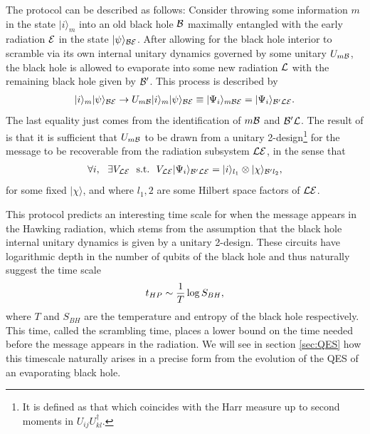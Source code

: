 \documentclass[12pt]{article}
\newcommand{\ran}{\rangle}
\begin{document}
The protocol can be described as follows: Consider throwing some information $m$ in the state $| i \ran_m$ into an old black hole ${\cal B}$ maximally entangled with the early radiation ${\cal E}$ in the state $| \psi \ran_{{\cal BE}}$. After allowing for the black hole interior to scramble via its own internal unitary dynamics governed by some unitary $U_{m \cal{B}}$, the black hole is allowed to evaporate into some new radiation $\cal{L}$ with the remaining black hole given by $\cal{B}'$. This process is described by
\begin{align}
|i \ran_{m} | \psi \ran_{{\cal BE}} \rightarrow U_{m \cal{B}} | i \ran_m | \psi \ran_{{\cal BE}}  \equiv | \Psi_i \ran_{m{\cal BE}} = | \Psi_i \ran_{{\cal B' L E}}.
\end{align}
The last equality just comes from the identification of $m\cal{B}$ and ${\cal{B' L}}$. The result of \cite{Hayden:2007cs} is that it is sufficient that $U_{m \cal{B}}$ to be drawn from a unitary 2-design\footnote{It is defined as that which coincides with the Harr measure up to second moments in $U_{ij} U_{kl}^\dagger$.} for the message to be recoverable from the radiation subsystem $\cal{L E}$, in the sense that
\begin{align}
\forall i, \ \ \exists V_{{\cal LE}} \ \ \mathrm{s.t.} \  \ V_{{\cal LE}} | \Psi_i \ran_{{\cal B' L E}} = | i \ran_{l_1} \otimes | \chi \ran_{{\cal B}'l_2} ,\label{HPcondition}
\end{align}
for some fixed $| \chi \ran$, and where $l_1,2$ are some Hilbert space factors of $\cal{L E}$.

This protocol predicts an interesting time scale for when the message appears in the Hawking radiation, which stems from the assumption that the black hole internal unitary dynamics is given by a unitary 2-design. These circuits have logarithmic depth in the number of qubits of the black hole and thus naturally suggest the time scale
\begin{align}
t_{HP} \sim {1 \over T} \log S_{BH},
\end{align}
where $T$ and $S_{BH}$ are the temperature and entropy of the black hole respectively. This time, called the scrambling time, places a lower bound on the time needed before the message appears in the radiation. We will see in section \ref{sec:QES} how this timescale naturally arises  in a precise form from the evolution of the QES of an evaporating black hole.
\end{document}
